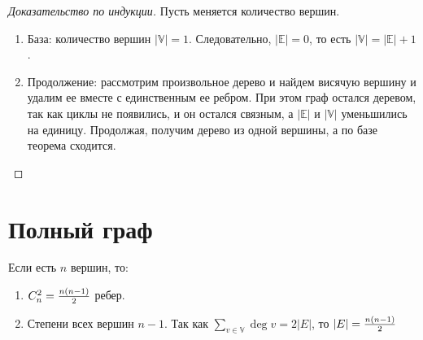 \documentclass[russian]{lecture-notes}
\begin{document}
	\begin{proof}[Доказательство по индукции]
		Пусть меняется количество вершин.
		\begin{enumerate}
			\item База: количество вершин $|\mathbb{V}| = 1$. Следовательно, $|\mathbb{E}| = 0$, то есть $|\mathbb{V}| = |\mathbb{E}| + 1$.
			\item Продолжение: рассмотрим произвольное дерево и найдем висячую вершину и удалим ее вместе с единственным ее ребром. При этом граф остался деревом, так как циклы не появились, и он остался связным, а $|\mathbb{E}|$ и $|\mathbb{V}|$ уменьшились на единицу. Продолжая, получим дерево из одной вершины, а по базе теорема сходится.
		\end{enumerate}
	\end{proof}

	\section{Полный граф}
	\begin{theorem}
		Если есть $n$ вершин, то:
		\begin{enumerate}
			\item $C^2_n = {n(n-1) \over 2}$ ребер.
			\item Степени всех вершин $n-1$. Так как $\sum_{v \in \mathbb{V}} \deg v = 2|E|$, то $|E| = {n(n-1) \over 2}$
		\end{enumerate}
	\end{theorem}
	
\end{document}
